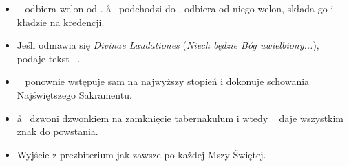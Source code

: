 \begin{itemize}
	\item \cc~ odbiera welon od \ii. \aa~ podchodzi do \cc, odbiera od niego
	      welon, składa go i kładzie na kredencji.
	\item Jeśli odmawia się \textit{Divinae Laudationes} (\textit{Niech będzie
		      Bóg uwielbiony...}), \cc~ podaje tekst \ii~.
	\item \ii~ ponownie wstępuje sam na najwyższy stopień i dokonuje schowania
	      Najświętszego Sakramentu.
	\item \aa~ dzwoni dzwonkiem na zamknięcie tabernakulum i wtedy \cc~ daje
	      wszystkim znak do powstania.
	\item Wyjście z prezbiterium jak zawsze po każdej Mszy Świętej.
\end{itemize}